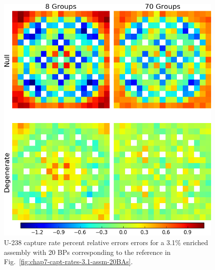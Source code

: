 \begin{figure}[h!]
\centering
\includegraphics[width=\linewidth]{figures/quantification/assm-31-20BPs/capt-err}
\vspace{2mm}
\caption[U-238 capture rate errors for a 3.1\% enriched assembly with 20 BPs]{U-238 capture rate percent relative errors errors for a 3.1\% enriched assembly with 20 \acp{BP} corresponding to the reference in Fig.~\ref{fig:chap7-capt-rates-3.1-assm-20BAs}.}
\label{fig:chap8-assm-3.1-20BPs-capt-err}
\end{figure}

\clearpage

